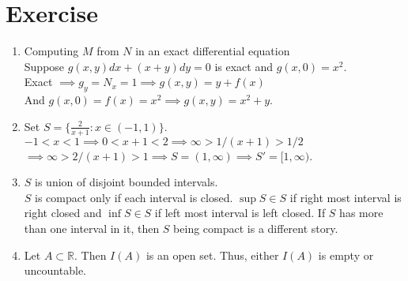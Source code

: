 \section{Exercise}
\begin{enumerate}
	\item Computing $M$ from $N$ in an exact differential equation\\
		Suppose $g(x,y)dx + (x+y)dy = 0$ is exact and $g(x,0) = x^2$.\\
		Exact $\implies g_y = N_x = 1 \implies g(x,y) = y+f(x)$\\ And $g(x,0) = f(x) = x^2 \implies g(x,y) = x^2+y$.
	\item Set $S = \{ \frac{2}{x+1} : x \in (-1,1) \}$.\\
		$-1 < x < 1 \implies 0 < x+1 < 2 \implies \infty > 1/(x+1) > 1/2$\\
		$\implies \infty > 2/(x+1) > 1 \implies S = (1,\infty) \implies S' = [1,\infty)$.
	\item $S$ is union of disjoint bounded intervals.\\
		$S$ is compact only if each interval is closed. $\sup S \in S$ if right most interval is right closed and $\inf S \in S$ if left most interval is left closed. If $S$ has more than one interval in it, then $S$ being compact is a different story.
	\item Let $A \subset \mathbb{R}$. Then $I(A)$ is an open set. Thus, either $I(A)$ is empty or uncountable.
\end{enumerate}

